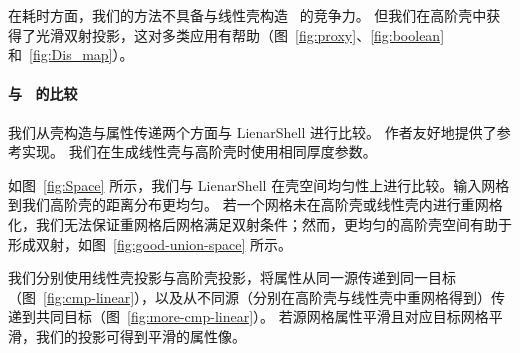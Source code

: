 在耗时方面，我们的方法不具备与线性壳构造~\cite{Jiang2020BijectivePI} 的竞争力。
但我们在高阶壳中获得了光滑双射投影，这对多类应用有帮助（图~\ref{fig:proxy}、\ref{fig:boolean} 和~\ref{fig:Dis_map}）。

\paragraph{与~\cite{Jiang2020BijectivePI} 的比较}
我们从壳构造与属性传递两个方面与 LienarShell 进行比较。
作者友好地提供了参考实现。
%
我们在生成线性壳与高阶壳时使用相同厚度参数。

如图~\ref{fig:Space} 所示，我们与 LienarShell 在壳空间均匀性上进行比较。输入网格到我们高阶壳的距离分布更均匀。
%
若一个网格未在高阶壳或线性壳内进行重网格化，我们无法保证重网格后网格满足双射条件；然而，更均匀的高阶壳空间有助于形成双射，如图~\ref{fig:good-union-space} 所示。


我们分别使用线性壳投影与高阶壳投影，将属性从同一源传递到同一目标（图~\ref{fig:cmp-linear}），以及从不同源（分别在高阶壳与线性壳中重网格得到）传递到共同目标（图~\ref{fig:more-cmp-linear}）。
若源网格属性平滑且对应目标网格平滑，我们的投影可得到平滑的属性像。


